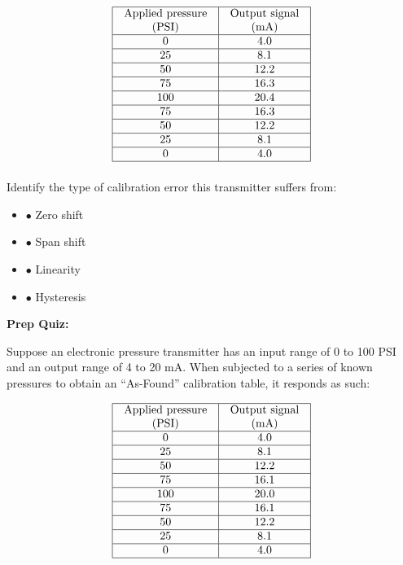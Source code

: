 $$\vbox{\offinterlineskip
\halign{\strut
\vrule \quad\hfil # \ \hfil & 
\vrule \quad\hfil # \ \hfil \vrule \cr
\noalign{\hrule}
%
Applied pressure & Output signal \cr
%
(PSI) & (mA) \cr
%
\noalign{\hrule}
%
0 & 4.0 \cr
%
\noalign{\hrule}
%
25 & 8.1 \cr
%
\noalign{\hrule}
%
50 & 12.2 \cr
%
\noalign{\hrule}
%
75 & 16.3 \cr
%
\noalign{\hrule}
%
100 & 20.4 \cr
%
\noalign{\hrule}
%
75 & 16.3 \cr
%
\noalign{\hrule}
%
50 & 12.2 \cr
%
\noalign{\hrule}
%
25 & 8.1 \cr
%
\noalign{\hrule}
%
0 & 4.0 \cr
%
\noalign{\hrule}
} %
}$$ %

\vskip 10pt

Identify the type of calibration error this transmitter suffers from:

\begin{itemize}
\item{$\bullet$} Zero shift
\vskip 5pt 
\item{$\bullet$} Span shift
\vskip 5pt 
\item{$\bullet$} Linearity
\vskip 5pt 
\item{$\bullet$} Hysteresis
\medskip
\end{itemize}



\vfil \eject

\noindent
{\bf Prep Quiz:}

Suppose an electronic pressure transmitter has an input range of 0 to 100 PSI and an output range of 4 to 20 mA.  When subjected to a series of known pressures to obtain an ``As-Found'' calibration table, it responds as such:


$$\vbox{\offinterlineskip
\halign{\strut
\vrule \quad\hfil # \ \hfil & 
\vrule \quad\hfil # \ \hfil \vrule \cr
\noalign{\hrule}
%
Applied pressure & Output signal \cr
%
(PSI) & (mA) \cr
%
\noalign{\hrule}
%
0 & 4.0 \cr
%
\noalign{\hrule}
%
25 & 8.1 \cr
%
\noalign{\hrule}
%
50 & 12.2 \cr
%
\noalign{\hrule}
%
75 & 16.1 \cr
%
\noalign{\hrule}
%
100 & 20.0 \cr
%
\noalign{\hrule}
%
75 & 16.1 \cr
%
\noalign{\hrule}
%
50 & 12.2 \cr
%
\noalign{\hrule}
%
25 & 8.1 \cr
%
\noalign{\hrule}
%
0 & 4.0 \cr
%
\noalign{\hrule}
} %
}$$ %


